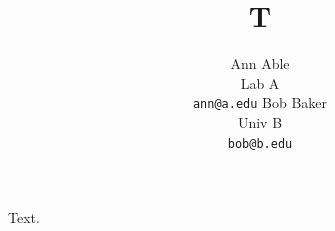 \documentclass{article}
\begin{document}
\title{T}
\author{Ann Able \\ Lab A\\ \texttt{ann@a.edu} \AND Bob Baker \\ Univ B\\ \texttt{bob@b.edu}}
\maketitle
Text.
\end{document}
